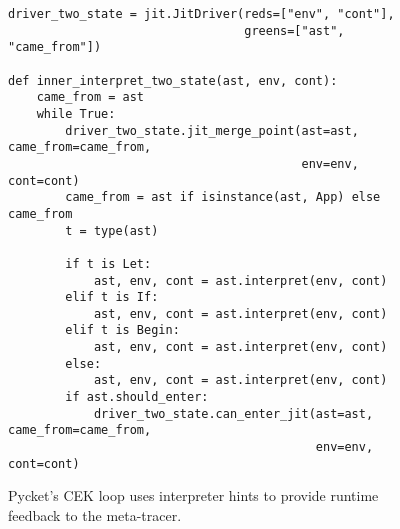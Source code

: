 \begin{figure}[!h]                    %
  \centering
  \begin{minipage}{0.9\textwidth}
\begin{lstlisting}[style=python-style]
driver_two_state = jit.JitDriver(reds=["env", "cont"],
                                 greens=["ast", "came_from"])

def inner_interpret_two_state(ast, env, cont):
    came_from = ast
    while True:
        driver_two_state.jit_merge_point(ast=ast, came_from=came_from,
                                         env=env, cont=cont)
        came_from = ast if isinstance(ast, App) else came_from
        t = type(ast)

        if t is Let:
            ast, env, cont = ast.interpret(env, cont)
        elif t is If:
            ast, env, cont = ast.interpret(env, cont)
        elif t is Begin:
            ast, env, cont = ast.interpret(env, cont)
        else:
            ast, env, cont = ast.interpret(env, cont)
        if ast.should_enter:
            driver_two_state.can_enter_jit(ast=ast, came_from=came_from,
                                           env=env, cont=cont)
\end{lstlisting}
  \end{minipage}
  \caption{Pycket's CEK loop uses interpreter hints to provide runtime feedback to the meta-tracer.}
  \label{fig:pycket-annotated-cek}
\end{figure}
